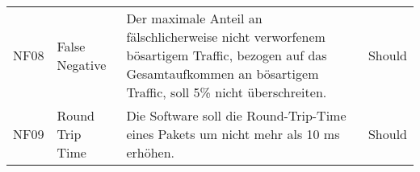 \documentclass[../review_1.tex]{subfiles}
\begin{document}
\begin{longtable}[ht] { p{1cm} p{4cm} p{7cm} l }
    NF08        & False Negative       & Der maximale Anteil an fälschlicherweise nicht verworfenem bösartigem Traffic, bezogen auf das Gesamtaufkommen an bösartigem Traffic, soll 5\% nicht überschreiten.                                                                      & Should          \\
    NF09        & Round Trip Time      & Die Software soll die Round-Trip-Time eines Pakets um nicht mehr als 10 ms erhöhen. & Should                                                                                                                                                                       \\
    \bottomrule

\end{longtable}
\end{document}
